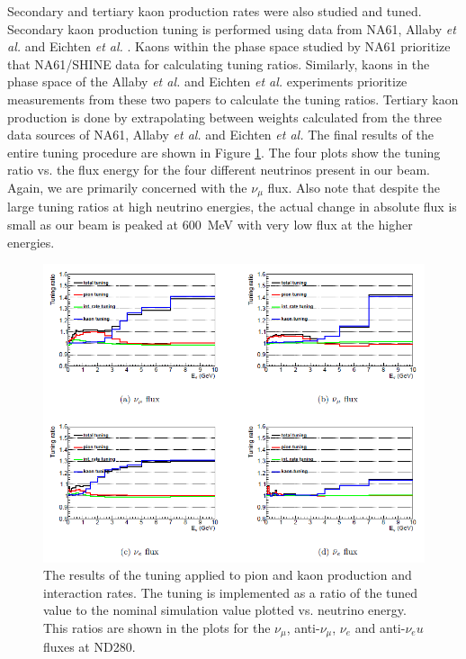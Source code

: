 Secondary and tertiary kaon production rates were also studied and tuned. Secondary kaon production tuning is performed using data from NA61, Allaby {\it et al.} \cite{allabyref} and Eichten {\it et al.} \cite{eichtenref}. Kaons within the phase space studied by NA61 prioritize that NA61/SHINE data for calculating tuning ratios. Similarly, kaons in the phase space of the Allaby {\it et al.} and Eichten {\it et al.} experiments prioritize measurements from these two papers to calculate the tuning ratios. Tertiary kaon production is done by extrapolating between weights calculated from the three data sources of NA61, Allaby {\it et al.} and Eichten {\it et al.} The final results of the entire tuning procedure are shown in Figure \ref{fig:tuningresult}. The four plots show the tuning ratio vs. the flux energy for the four different neutrinos present in our beam. Again, we are primarily concerned with the $\nu_\mu$ flux. Also note that despite the large tuning ratios at high neutrino energies, the actual change in absolute flux is small as our beam is peaked at 600~MeV with very low flux at the higher energies.

\begin{figure}
\centering
\includegraphics[width=6.5in]{Figures/flux/tuningresult.PNG}
\caption{The results of the tuning applied to pion and kaon production and interaction rates. The tuning is implemented as a ratio of the tuned value to the nominal simulation value plotted vs. neutrino energy. This ratios are shown in the plots for the  $\nu_\mu$, anti-$\nu_\mu$, $\nu_e$ and anti-$\nu_eu$ fluxes at ND280.} 
\label{fig:tuningresult}
\end{figure}

